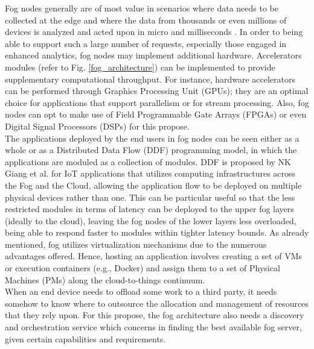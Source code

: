 \noindent\tab Fog nodes generally are of most value in scenarios where data needs to be collected at the edge and where the data from thousands or even millions of devices is analyzed and acted upon in micro and milliseconds \cite{openfog2017openfog}. In order to being able to support such a large number of requests, especially those engaged in enhanced analytics, fog nodes may implement additional hardware. Accelerators modules (refer to Fig. \ref{fog_architecture}) can be implemented to provide supplementary computational throughput. For instance, hardware accelerators can be performed through Graphics Processing Unit (GPUs); they are an optimal choice for applications that support parallelism or for stream processing. Also, fog nodes can opt to make use of Field Programmable Gate Arrays (FPGAs) or even Digital Signal Processors (DSPs) for this propose.\\

\noindent\tab The applications deployed by the end users in fog nodes can be seen either as a whole or as a Distributed Data Flow (DDF) programming model, in which the applications are moduled as a collection of modules. DDF is proposed by NK Giang et al. \cite{giang2015developing} for IoT applications that utilizes computing infrastructures across the Fog and the Cloud, allowing the application flow to be deployed on multiple physical devices rather than one. This can be particular useful so that the less restricted modules in terms of latency can be deployed to the upper fog layers (ideally to the cloud), leaving the fog nodes of the lower layers less overloaded, being able to respond faster to modules within tighter latency bounds. As already mentioned, fog utilizes virtualization mechanisms due to the numerous advantages offered. Hence, hosting an application involves creating a set of VMs or execution containers (e.g., Docker) and assign them to a set of Physical Machines (PMs) along the cloud-to-things continuum.\\

\noindent\tab When an end device needs to offload some work to a third party, it needs somehow to know where to outsource the allocation and management of resources that they rely upon. For this propose, the fog architecture also needs a discovery and orchestration service which concerns in finding the best available fog server, given certain capabilities and requirements.\\

